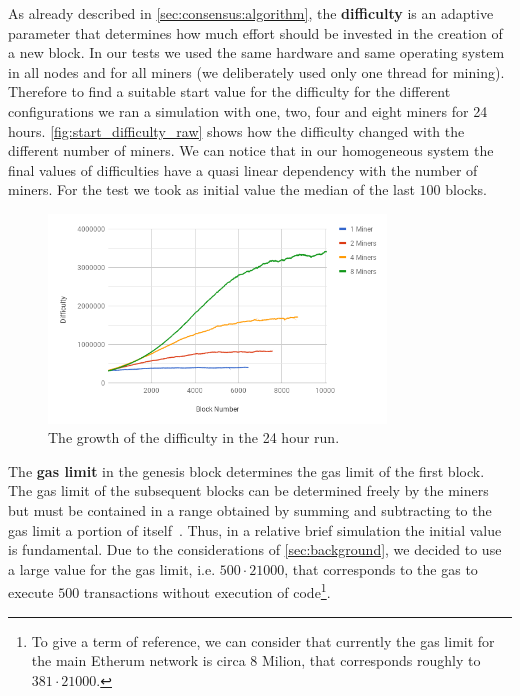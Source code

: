 As already described in \autoref{sec:consensus:algorithm}, the
\textbf{difficulty} is an adaptive parameter that determines how much effort
should be invested in the creation of a new block. In our tests we used the same
hardware and same operating system in all nodes and for all miners (we
deliberately used only one thread for mining). Therefore to find a suitable
start value for the difficulty for the different configurations we ran a
simulation with one, two, four and eight miners for 24 hours.
\autoref{fig:start_difficulty_raw} shows how the difficulty changed with the
different number of miners. We can notice that in our homogeneous system the
final values of difficulties have a quasi linear dependency with the number of
miners. For the test we took as initial value the median of the last $100$
blocks.
\begin{figure}
  \begin{center}
    \includegraphics[width=0.8\textwidth]{./res/img/start_difficulty_all.png}
    \caption{The growth of the difficulty in the 24 hour run.}
    \label{fig:start_difficulty_raw}
  \end{center}
\end{figure}

The \textbf{gas limit} in the genesis block determines the gas limit of the
first block. The gas limit of the subsequent blocks can be determined freely by
the miners but must be contained in a range obtained by summing and subtracting
to the gas limit a portion of itself~\cite{wood2018ethereum}. Thus, in a
relative brief simulation the initial value is fundamental. Due to the
considerations of \autoref{sec:background}, we decided to use a large value for
the gas limit, i.e. $500 \cdot 21000$, that corresponds to the gas to execute
$500$ transactions without execution of code\footnote{To give a term of
reference, we can consider that currently the gas limit for the main Etherum
network is circa $8$ Milion, that corresponds roughly to $381 \cdot 21000$.}.


